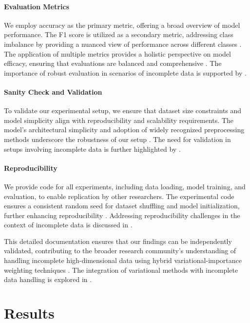 \documentclass[11pt]{article}
\begin{document}
\paragraph{Evaluation Metrics} We employ accuracy as the primary metric, offering a broad overview of model performance. The F1 score is utilized as a secondary metric, addressing class imbalance by providing a nuanced view of performance across different classes \cite{robust2023,flexible2023}. The application of multiple metrics provides a holistic perspective on model efficacy, ensuring that evaluations are balanced and comprehensive \cite{a2023}. The importance of robust evaluation in scenarios of incomplete data is supported by \cite{survival2022,supervised2018,evaluating2023}.

\paragraph{Sanity Check and Validation} To validate our experimental setup, we ensure that dataset size constraints and model simplicity align with reproducibility and scalability requirements. The model's architectural simplicity and adoption of widely recognized preprocessing methods underscore the robustness of our setup \cite{lux2025}. The need for validation in setups involving incomplete data is further highlighted by \cite{quantum2013,fast2010}.

\paragraph{Reproducibility} We provide code for all experiments, including data loading, model training, and evaluation, to enable replication by other researchers. The experimental code ensures a consistent random seed for dataset shuffling and model initialization, further enhancing reproducibility \cite{mixfean2024,gaussian2024,bootstrap2024}. Addressing reproducibility challenges in the context of incomplete data is discussed in \cite{learned2020,mixed2014}.

This detailed documentation ensures that our findings can be independently validated, contributing to the broader research community's understanding of handling incomplete high-dimensional data using hybrid variational-importance weighting techniques \cite{massively2025,nonlinear2024,annealed2019}. The integration of variational methods with incomplete data handling is explored in \cite{variational2021,variational2021,explicit2024}.

\section{Results}
\end{document}
